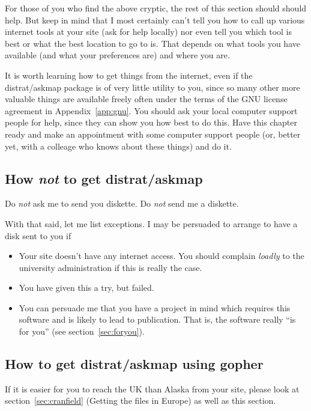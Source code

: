 \documentclass[%
	11pt,
        a4paper,
        twoside]{workrep}
\newcommand*{\prg}[1]{\textsf{#1}}		%
\newcommand{\dram}{\prg{distrat}/\prg{askmap}\xspace}	%
\begin{document}
For those of you who find the above cryptic, the rest of this section
should should help.  But keep in mind that I most certainly can't
tell you how to call up various internet tools at your site (ask for
help locally) nor even tell you which tool is best or what the best location
to go to is.  That depends on what tools you have available (and what
your preferences are) and where you are.

It is worth learning how to get things from the internet, even if the
\dram package is of very little utility to you, since so many other
more valuable things are available freely often under the terms of
the GNU license agreement in Appendix~\ref{app:gnu}\@.  You should
ask your local computer support people for help, since they can show
you how best to do this.  Have this chapter ready and make an
appointment with some computer support people (or, better yet, with a
colleage who knows about these things) and do it.

\subsection{How \emph{not} to get \dram}\label{sec:hownot}

Do \emph{not} ask me to send you diskette.
Do \emph{not} send me a diskette.

With that said, let me list exceptions.  I may be persuaded to
arrange to have a disk sent to you if
\begin{itemize}
\item	Your site doesn't have any internet access.  You
	should complain \emph{loadly} to the university administration
	if this is really the case.
\item	You have given this a try, but failed.
\item	You can persuade me that you have a project in mind which
	requires this software and is likely to lead to publication.
	That is, the software really ``is for you''
	(see section~\ref{sec:foryou}).
\end{itemize}

\subsection{How to get \dram using gopher}\label{sec:gopher}

If it is easier for you to reach the UK than Alaska from your site,
please look at section~\ref{sec:cranfield} (Getting the files in Europe)
as well as this section.
\end{document}
